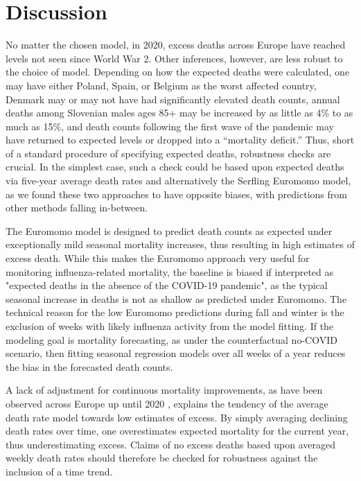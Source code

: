 \documentclass[12pt]{article}
\begin{document}
\section*{Discussion}

No matter the chosen model, in 2020, excess deaths across Europe have reached levels not seen since World War 2. Other inferences, however, are less robust to the choice of model. Depending on how the expected deaths were calculated, one may have either Poland, Spain, or Belgium as the worst affected country, Denmark may or may not have had significantly elevated death counts, annual deaths among Slovenian males ages 85+ may be increased by as little as 4\% to as much as 15\%, and death counts following the first wave of the pandemic may have returned to expected levels or dropped into a “mortality deficit.” Thus, short of a standard procedure of specifying expected deaths, robustness checks are crucial. In the simplest case, such a check could be based upon expected deaths via five-year average death rates and alternatively the Serfling Euromomo model, as we found these two approaches to have opposite biases, with predictions from other methods falling in-between.

The Euromomo model is designed to predict death counts as expected under exceptionally mild seasonal mortality increases, thus resulting in high estimates of excess death. While this makes the Euromomo approach very useful for monitoring influenza-related mortality, the baseline is biased if interpreted as "expected deaths in the absence of the COVID-19 pandemic", as the typical seasonal increase in deaths is not as shallow as predicted under Euromomo. The technical reason for the low Euromomo predictions during fall and winter is the exclusion of weeks with likely influenza activity from the model fitting. If the modeling goal is mortality forecasting, as under the counterfactual no-COVID scenario, then fitting seasonal regression models over all weeks of a year reduces the bias in the forecasted death counts.

A lack of adjustment for continuous mortality improvements, as have been observed across Europe up until 2020 \citep{Leon2011, Aburto2021a}, explains the tendency of the average death rate model towards low estimates of excess. By simply averaging declining death rates over time, one overestimates expected mortality for the current year, thus underestimating excess. Claims of no excess deaths based upon averaged weekly death rates should therefore be checked for robustness against the inclusion of a time trend.
\end{document}
